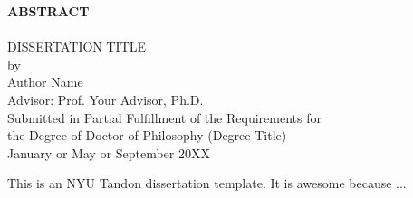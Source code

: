 \begin{center}

\sffamily
\LARGE
\textbf{ABSTRACT} \\
\HRule \\
\textsc{
\textrm{DISSERTATION TITLE}}\\[0.25cm]

\normalsize{by} \\[0.5cm]
\Large
\textrm{
Author Name\\[0.5cm]
Advisor: Prof. Your Advisor, Ph.D.}\\[.5cm]

\normalsize
\textrm{Submitted in Partial Fulfillment of the Requirements for \\
the Degree of Doctor of Philosophy (Degree Title)} \\[0.5cm]

\textrm{
January or May or September 20XX} \\[1cm]

\end{center}

\normalsize
This is an NYU Tandon dissertation template. It is awesome because ...
